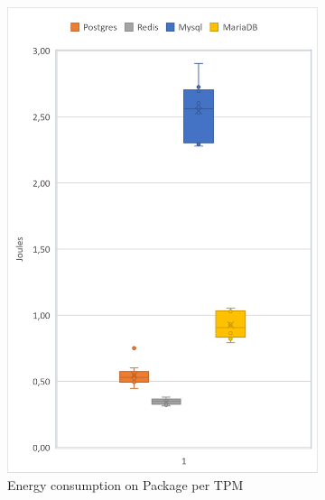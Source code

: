 \begin{figure}[!ht]
        \centering
        \begin{subfigure}[b]{0.32\textwidth}
            \centering
			\includegraphics[width=1\columnwidth]{results/boxplot/10m/Packgage-tpm.png}
			\caption[]%
            {{\small Energy consumption on Package per TPM}}    
			\label{fig:bocplottranspackage10m}
        \end{subfigure}
        \begin{subfigure}[b]{0.32\textwidth}  
            \centering 

\end{subfigure}
\end{figure}
